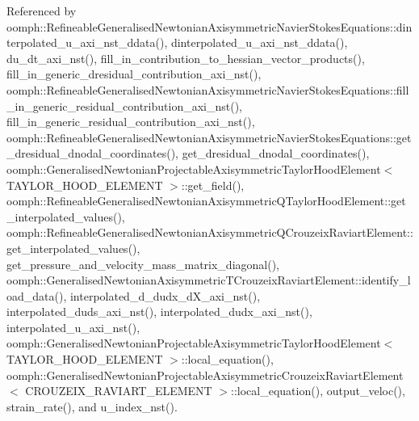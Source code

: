 Referenced by oomph\+::\+Refineable\+Generalised\+Newtonian\+Axisymmetric\+Navier\+Stokes\+Equations\+::dinterpolated\+\_\+u\+\_\+axi\+\_\+nst\+\_\+ddata(), dinterpolated\+\_\+u\+\_\+axi\+\_\+nst\+\_\+ddata(), du\+\_\+dt\+\_\+axi\+\_\+nst(), fill\+\_\+in\+\_\+contribution\+\_\+to\+\_\+hessian\+\_\+vector\+\_\+products(), fill\+\_\+in\+\_\+generic\+\_\+dresidual\+\_\+contribution\+\_\+axi\+\_\+nst(), oomph\+::\+Refineable\+Generalised\+Newtonian\+Axisymmetric\+Navier\+Stokes\+Equations\+::fill\+\_\+in\+\_\+generic\+\_\+residual\+\_\+contribution\+\_\+axi\+\_\+nst(), fill\+\_\+in\+\_\+generic\+\_\+residual\+\_\+contribution\+\_\+axi\+\_\+nst(), oomph\+::\+Refineable\+Generalised\+Newtonian\+Axisymmetric\+Navier\+Stokes\+Equations\+::get\+\_\+dresidual\+\_\+dnodal\+\_\+coordinates(), get\+\_\+dresidual\+\_\+dnodal\+\_\+coordinates(), oomph\+::\+Generalised\+Newtonian\+Projectable\+Axisymmetric\+Taylor\+Hood\+Element$<$ T\+A\+Y\+L\+O\+R\+\_\+\+H\+O\+O\+D\+\_\+\+E\+L\+E\+M\+E\+N\+T $>$\+::get\+\_\+field(), oomph\+::\+Refineable\+Generalised\+Newtonian\+Axisymmetric\+Q\+Taylor\+Hood\+Element\+::get\+\_\+interpolated\+\_\+values(), oomph\+::\+Refineable\+Generalised\+Newtonian\+Axisymmetric\+Q\+Crouzeix\+Raviart\+Element\+::get\+\_\+interpolated\+\_\+values(), get\+\_\+pressure\+\_\+and\+\_\+velocity\+\_\+mass\+\_\+matrix\+\_\+diagonal(), oomph\+::\+Generalised\+Newtonian\+Axisymmetric\+T\+Crouzeix\+Raviart\+Element\+::identify\+\_\+load\+\_\+data(), interpolated\+\_\+d\+\_\+dudx\+\_\+d\+X\+\_\+axi\+\_\+nst(), interpolated\+\_\+duds\+\_\+axi\+\_\+nst(), interpolated\+\_\+dudx\+\_\+axi\+\_\+nst(), interpolated\+\_\+u\+\_\+axi\+\_\+nst(), oomph\+::\+Generalised\+Newtonian\+Projectable\+Axisymmetric\+Taylor\+Hood\+Element$<$ T\+A\+Y\+L\+O\+R\+\_\+\+H\+O\+O\+D\+\_\+\+E\+L\+E\+M\+E\+N\+T $>$\+::local\+\_\+equation(), oomph\+::\+Generalised\+Newtonian\+Projectable\+Axisymmetric\+Crouzeix\+Raviart\+Element$<$ C\+R\+O\+U\+Z\+E\+I\+X\+\_\+\+R\+A\+V\+I\+A\+R\+T\+\_\+\+E\+L\+E\+M\+E\+N\+T $>$\+::local\+\_\+equation(), output\+\_\+veloc(), strain\+\_\+rate(), and u\+\_\+index\+\_\+nst().

\mbox{\label{classoomph_1_1GeneralisedNewtonianAxisymmetricNavierStokesEquations_a00a6315cdffc1f3613711859f74146aa}} 
